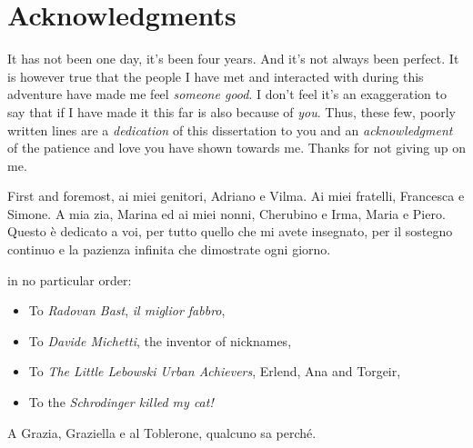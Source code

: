 
\chapter*{Acknowledgments}

It has not been one day, it's been four years.
And it's not always been perfect.
It is however true that the people I have met and interacted with during
this adventure have made me feel \emph{someone good}.
I don't feel it's an exaggeration to say that if I have made it this far
is also because of \emph{you}.
Thus, these few, poorly written lines are
a \emph{dedication} of this dissertation to you
and an \emph{acknowledgment}
of the patience and love you have shown towards me.
Thanks for not giving up on me.

First and foremost, \textitalian{ai miei genitori,
Adriano e Vilma. Ai miei fratelli, Francesca e Simone. A mia zia, Marina
ed ai miei nonni, Cherubino e Irma, Maria e Piero. Questo è dedicato a
voi, per tutto quello che mi avete insegnato, per il sostegno continuo e
la pazienza infinita che dimostrate ogni giorno.}

in no particular order:
\begin{itemize}
  \item To \emph{Radovan Bast}, \emph{il miglior fabbro},
  \item To \emph{Davide Michetti}, the inventor of nicknames,
  \item To \emph{The Little Lebowski Urban Achievers}, Erlend, Ana and
    Torgeir,
  \item To the \emph{Schrodinger killed my cat!}
\end{itemize}

\textitalian{A Grazia, Graziella e al Toblerone, qualcuno sa perché.}

